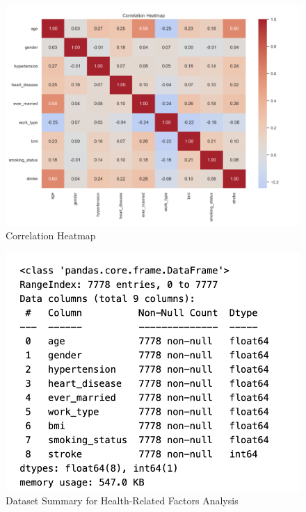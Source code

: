 \documentclass[runningheads]{llncs}
\begin{document}
\begin{enumerate}
\begin{figure}
    \centering
    \includegraphics[width=1.0\linewidth]{eda2.png}
    \caption{Correlation Heatmap} 
    \label{fig:enter-label}
\end{figure}

\clearpage
\begin{figure}
    \centering
    \includegraphics[width=.8\linewidth]{eda3.png}
    \caption{Dataset Summary for Health-Related Factors Analysis} 
    \label{fig:enter-label}
\end{figure}


\end{enumerate}
\end{document}
